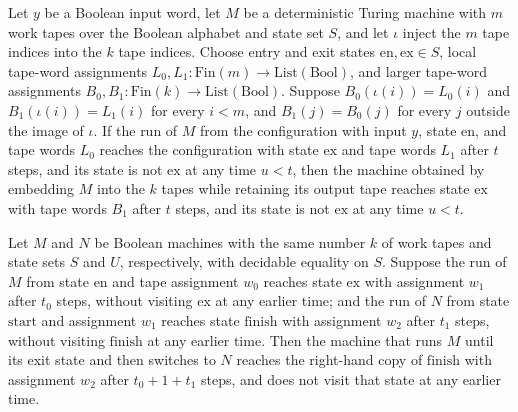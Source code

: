 \begin{theorem}
\label{Turing.cert_embed_call}
\leanok
{}
Let $y$ be a Boolean input word, let $M$ be a deterministic Turing machine with $m$ work
tapes over the Boolean alphabet and state set $S$, and let $\iota$ inject the $m$ tape
indices into the $k$ tape indices. Choose entry and exit states
$\mathrm{en},\mathrm{ex}\in S$, local tape-word assignments
$L_0,L_1:\mathrm{Fin}(m)\to\mathrm{List}(\mathrm{Bool})$, and larger tape-word
assignments $B_0,B_1:\mathrm{Fin}(k)\to\mathrm{List}(\mathrm{Bool})$. Suppose
$B_0(\iota(i))=L_0(i)$ and $B_1(\iota(i))=L_1(i)$ for every $i<m$, and $B_1(j)=B_0(j)$
for every $j$ outside the image of $\iota$. If the run of $M$ from the configuration
with input $y$, state $\mathrm{en}$, and tape words $L_0$ reaches the configuration with
state $\mathrm{ex}$ and tape words $L_1$ after $t$ steps, and its state is not
$\mathrm{ex}$ at any time $u<t$, then the machine obtained by embedding $M$ into the $k$
tapes while retaining its output tape reaches state $\mathrm{ex}$ with tape words $B_1$
after $t$ steps, and its state is not $\mathrm{ex}$ at any time $u<t$.
\end{theorem}

\begin{theorem}
\label{Turing.cert_seq}
\leanok
{}
Let $M$ and $N$ be Boolean machines with the same number $k$ of work tapes and state
sets $S$ and $U$, respectively, with decidable equality on $S$. Suppose the run of $M$
from state $\mathrm{en}$ and tape assignment $w_0$ reaches state $\mathrm{ex}$ with
assignment $w_1$ after $t_0$ steps, without visiting $\mathrm{ex}$ at any earlier time;
and the run of $N$ from state $\mathrm{start}$ and assignment $w_1$ reaches state
$\mathrm{finish}$ with assignment $w_2$ after $t_1$ steps, without visiting
$\mathrm{finish}$ at any earlier time. Then the machine that runs $M$ until its exit
state and then switches to $N$ reaches the right-hand copy of $\mathrm{finish}$ with
assignment $w_2$ after $t_0+1+t_1$ steps, and does not visit that state at any earlier
time.
\end{theorem}

